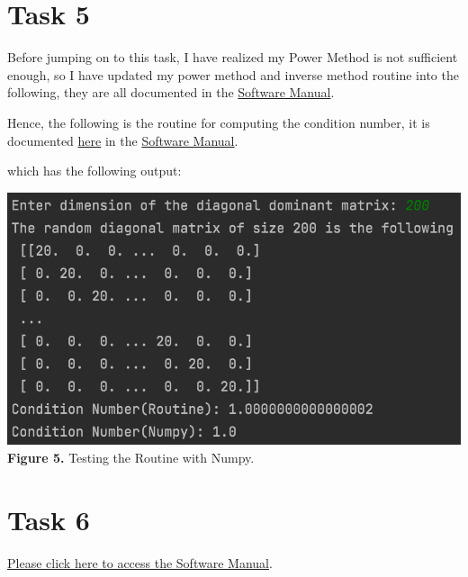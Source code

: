 \documentclass{article}
\begin{document}
\section*{Task 5}
Before jumping on to this task, I have realized my Power Method is not sufficient enough, so I have updated my power method and inverse method routine into the following, they are all documented in the \href{https://github.com/GoByMark/math4610/blob/main/Homework_Tasks/Software_Manual/Software_Manual_toc.md}{Software Manual}.


Hence, the following is the routine for computing the condition number, it is documented \href{https://github.com/GoByMark/math4610/blob/main/Homework_Tasks/Tasksheet_10/src/conNum.py}{here} in the \href{https://github.com/GoByMark/math4610/blob/main/Homework_Tasks/Software_Manual/Software_Manual_toc.md}{Software Manual}.

which has the following output:
\begin{center}
\includegraphics[width=\textwidth]{Screenshots/5.png}\\
{\bf Figure 5.} Testing the Routine with Numpy.
\end{center}

\section*{Task 6}
\href{https://github.com/GoByMark/math4610/blob/main/Homework_Tasks/Software_Manual/Software_Manual_toc.md}{Please click here to access the Software Manual}.
\end{document}
